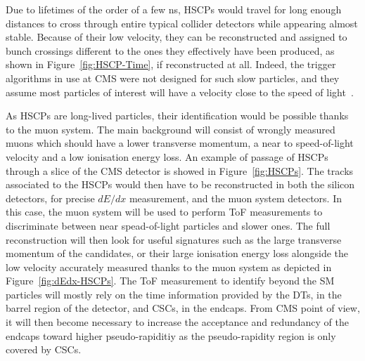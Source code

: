 	Due to lifetimes of the order of a few \si{ns}, HSCPs would travel for long enough distances to cross through entire typical collider detectors while appearing almost stable. Because of their low velocity, they can be reconstructed and assigned to bunch crossings different to the ones they effectively have been produced, as shown in Figure~\ref{fig:HSCP-Time}, if reconstructed at all. Indeed, the trigger algorithms in use at CMS were not designed for such slow particles, and they assume most particles of interest will have a velocity close to the speed of light~\cite{KHACHATRYAN2017,KAZANA2009}.
	
	As HSCPs are long-lived particles, their identification would be possible thanks to the muon system. The main background will consist of wrongly measured muons which should have a lower transverse momentum, a near to speed-of-light velocity and a low ionisation energy loss. An example of passage of HSCPs through a slice of the CMS detector is showed in Figure~\ref{fig:HSCPs}. The tracks associated to the HSCPs would then have to be reconstructed in both the silicon detectors, for precise $dE/dx$ measurement, and the muon system detectors. In this case, the muon system will be used to perform \acf{ToF} measurements to discriminate between near spead-of-light particles and slower ones. The full reconstruction will then look for useful signatures such as the large transverse momentum of the candidates, or their large ionisation energy loss alongside the low velocity accurately measured thanks to the muon system as depicted in Figure~\ref{fig:dEdx-HSCPs}. The ToF measurement to identify beyond the \acl{SM} particles will mostly rely on the time information provided by the \acl{DT}s, in the barrel region of the detector, and \acl{CSC}s, in the endcaps. From CMS point of view, it will then become necessary to increase the acceptance and redundancy of the endcaps toward higher pseudo-rapiditiy as the pseudo-rapidity region  is only covered by CSCs.\\
	
\endgroup

